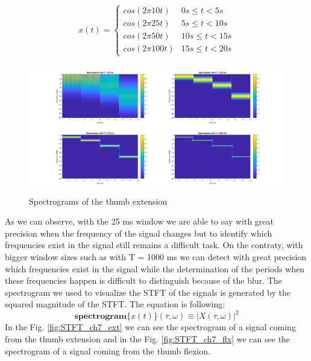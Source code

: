 \begin{equation}
x(t) = \begin{cases}
      cos(2 \pi 10 t) & 0s \leq t < 5s \\
      cos(2 \pi 25 t) & 5s \leq t < 10s\\
      cos(2 \pi 50 t) & 10s \leq t < 15s \\
      cos(2 \pi 100 t) & 15s \leq t < 20s
\end{cases}
\end{equation}
\begin{figure}[!htb]
\includegraphics[width=20cm,center,keepaspectratio]{figures/spectrograms}
\caption{Spectrograms of the thumb extension}
\label{fig:spectrograms}
\end{figure}
As we can observe, with the 25 ms window we are able to say with great precision when the frequency of the signal changes but to identify which frequencies exist in the signal still remains a difficult task. On the contraty, with bigger window sizes such as with T = 1000 ms we can detect with great precision which frequencies exist in the signal while the determination of the periods when these frequencies happen is difficult to distinguish because of the blur.
\newpage
The spectrogram we used to visualize the STFT of the signals is generated by the squared magnitude of the STFT. The equation is following:
\begin{equation}
\textbf{spectrogram}\{x(t)\}(\tau, \omega) \equiv \left|X(\tau, \omega)\right|^2
\end{equation}
In the Fig. \ref{fig:STFT_ch7_ext} we can see the spectrogram of a signal coming from the thumb extension and in the Fig. \ref{fig:STFT_ch7_flx} we can see the spectrogram of a signal coming from the thumb flexion.
